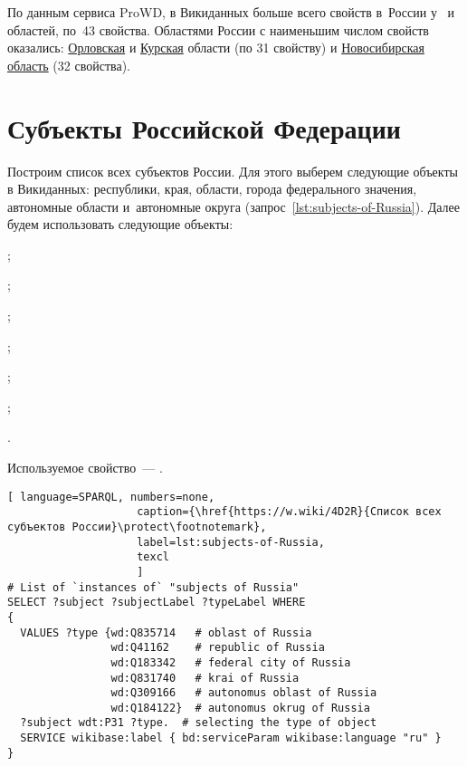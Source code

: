 \newpage
По данным сервиса ProWD, 
в Викиданных больше всего свойств в~России у~ 
и~ областей, по~43 свойства. 
%
Областями России с наименьшим числом свойств оказались: 
\href{http://www.wikidata.org/entity/Q3129}{Орловская} и \href{http://www.wikidata.org/entity/Q3178}{Курская} области (по 31 свойству) и \href{http://www.wikidata.org/entity/Q5851}{Новосибирская область} (32 свойства).




\section{Субъекты Российской Федерации}

Построим список всех субъектов России. 
Для этого выберем следующие объекты в Викиданных: 
республики, края, области, города федерального значения, автономные области и~автономные округа (запрос~\ref{lst:subjects-of-Russia}). 
Далее будем использовать следующие объекты:
\begin{compactitemize}
	\item{};
	\item{};
	\item{};
	\item{};
	\item{};
	\item{};
	\item{}.
\end{compactitemize}
Используемое свойство~--- .

\begin{lstlisting}[ language=SPARQL, numbers=none,
                    caption={\href{https://w.wiki/4D2R}{Список всех субъектов России}\protect\footnotemark},
                    label=lst:subjects-of-Russia,
                    texcl 
                    ]
# List of `instances of` "subjects of Russia" 
SELECT ?subject ?subjectLabel ?typeLabel WHERE
{  
  VALUES ?type {wd:Q835714   # oblast of Russia
                wd:Q41162    # republic of Russia
                wd:Q183342   # federal city of Russia
                wd:Q831740   # krai of Russia
                wd:Q309166   # autonomus oblast of Russia
                wd:Q184122}  # autonomus okrug of Russia
  ?subject wdt:P31 ?type.  # selecting the type of object
  SERVICE wikibase:label { bd:serviceParam wikibase:language "ru" }
}
\end{lstlisting}%




